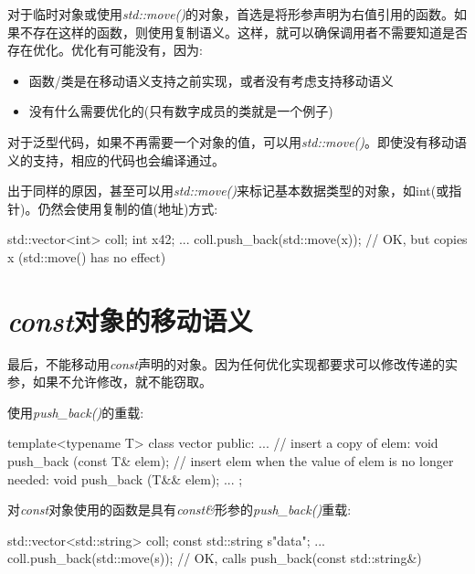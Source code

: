 对于临时对象或使用\textit{std::move()}的对象，首选是将形参声明为右值引用的函数。如果不存在这样的函数，则使用复制语义。这样，就可以确保调用者不需要知道是否存在优化。优化有可能没有，因为:\par

\begin{itemize}
  \item 函数/类是在移动语义支持之前实现，或者没有考虑支持移动语义
  \item 没有什么需要优化的(只有数字成员的类就是一个例子)
\end{itemize}

对于泛型代码，如果不再需要一个对象的值，可以用\textit{std::move()}。即使没有移动语义的支持，相应的代码也会编译通过。\par

出于同样的原因，甚至可以用\textit{std::move()}来标记基本数据类型的对象，如int(或指针)。仍然会使用复制的值(地址)方式:\par

\begin{codebox}[cpp]
std::vector<int> coll;
int x{42};
...
coll.push_back(std::move(x)); // OK, but copies x (std::move() has no effect)
\end{codebox}


\section{\textit{const}对象的移动语义}

最后，不能移动用\textit{const}声明的对象。因为任何优化实现都要求可以修改传递的实参，如果不允许修改，就不能窃取。\par

使用\textit{push\_\allowbreak{}back(\allowbreak{})\allowbreak{}}的重载:\par

\begin{codebox}[cpp]
template<typename T>
class vector {
  public:
  ...
  // insert a copy of elem:
  void push_back (const T& elem);
  // insert elem when the value of elem is no longer needed:
  void push_back (T&& elem);
  ...
};
\end{codebox}

对\textit{const}对象使用的函数是具有\textit{const\&}形参的\textit{push\_\allowbreak{}back(\allowbreak{})\allowbreak{}}重载:\par

\begin{codebox}[cpp]
std::vector<std::string> coll;
const std::string s{"data"};
...
coll.push_back(std::move(s)); // OK, calls push_back(const std::string&)
\end{codebox}

